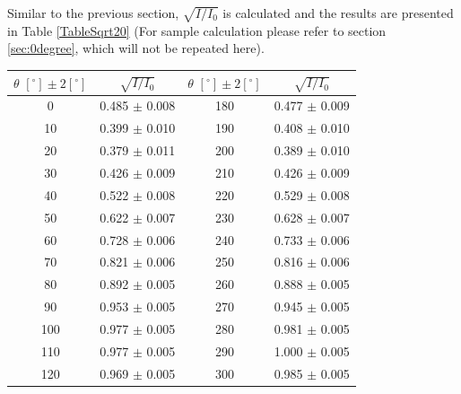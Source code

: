 \documentclass[a4paper]{article}
\begin{document}
Similar to the previous section, $\sqrt{I/I_0}$ is calculated and the results are presented in Table \ref{TableSqrt20} (For sample calculation please refer to section \ref{sec:0degree}, which will not be repeated here).

\begin{table}[H]
	\centering
	\begin{tabular}{cc||cc}
		\hline
		$\theta\,\,[^\circ] \pm 2[^\circ]$ & $\sqrt{I/I_0}$       & $\theta\,\,[^\circ] \pm 2[^\circ]$ & $\sqrt{I/I_0}$      \\
		\hline
		0                                  & 0.485    $\pm$ 0.008 & 180                                & 0.477   $\pm$ 0.009 \\
		10                                 & 0.399    $\pm$ 0.010 & 190                                & 0.408   $\pm$ 0.010 \\
		20                                 & 0.379    $\pm$ 0.011 & 200                                & 0.389   $\pm$ 0.010 \\
		30                                 & 0.426    $\pm$ 0.009 & 210                                & 0.426   $\pm$ 0.009 \\
		40                                 & 0.522    $\pm$ 0.008 & 220                                & 0.529   $\pm$ 0.008 \\
		50                                 & 0.622    $\pm$ 0.007 & 230                                & 0.628   $\pm$ 0.007 \\
		60                                 & 0.728    $\pm$ 0.006 & 240                                & 0.733   $\pm$ 0.006 \\
		70                                 & 0.821    $\pm$ 0.006 & 250                                & 0.816   $\pm$ 0.006 \\
		80                                 & 0.892    $\pm$ 0.005 & 260                                & 0.888   $\pm$ 0.005 \\
		90                                 & 0.953    $\pm$ 0.005 & 270                                & 0.945   $\pm$ 0.005 \\
		100                                & 0.977    $\pm$ 0.005 & 280                                & 0.981   $\pm$ 0.005 \\
		110                                & 0.977    $\pm$ 0.005 & 290                                & 1.000   $\pm$ 0.005 \\
		120                                & 0.969    $\pm$ 0.005 & 300                                & 0.985   $\pm$ 0.005 \\

\end{tabular}
\end{table}
\end{document}

